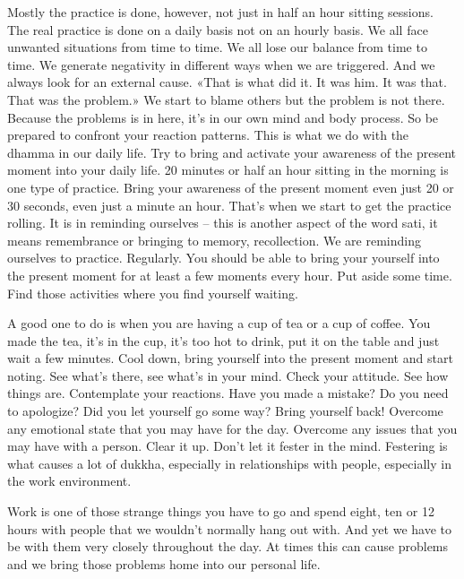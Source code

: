 \documentclass[letterpaper,10pt,english]{sphinxmanual}
\begin{document}
\sphinxAtStartPar
Mostly the practice is done, however, not just in half an hour sitting
sessions. The real practice is done on a daily basis not on an hourly basis.
We all face unwanted situations from time to time. We all lose our balance
from  time  to  time.  We  generate  negativity  in  different  ways  when  we  are
triggered. And we always look for an external cause. «That is what did it. It
was him. It was that. That was the problem.» We start to blame others but the
problem is not there. Because the problems is in here, it’s in our own mind
and body process. So be prepared to confront your reaction patterns. This is
what we do with the dhamma in our daily life. Try to bring and activate your
awareness of the present moment into your daily life. 20 minutes or half an
hour sitting in the morning is one type of practice. Bring your awareness of
the present moment even just 20 or 30 seconds, even just a minute an hour.
That’s when we start to get the practice rolling. It is in reminding ourselves
– this is another aspect of the word sati, it means remembrance or bringing
to memory, recollection. We are reminding ourselves to practice. Regularly.
You  should  be  able  to  bring  your  yourself  into  the  present  moment  for  at
least a few moments every hour. Put aside some time. Find those activities
where you find yourself waiting.

\sphinxAtStartPar
A good one to do is when you are having a cup of tea or a cup of coffee.
You made the tea, it’s in the cup, it’s too hot to drink, put it on the table and
just wait a few minutes. Cool down, bring yourself into the present moment
and start noting. See what’s there, see what’s in your mind. Check your attitude. See how things are. Contemplate your reactions. Have you made a mistake? Do you need to apologize? Did you let yourself go some way? Bring
yourself back! Overcome any emotional state that you may have for the day.
Overcome any issues that you may have with a person. Clear it up. Don’t let
it fester in the mind. Festering is what causes a lot of dukkha, especially in
relationships with people, especially in the work environment.

\sphinxAtStartPar
Work is one of those strange things you have to go and spend eight, ten
  or 12 hours with people that we wouldn’t normally hang out with. And yet
we have to be with them very closely throughout the day. At times this can
cause problems and we bring those problems home into our personal life.
\end{document}
